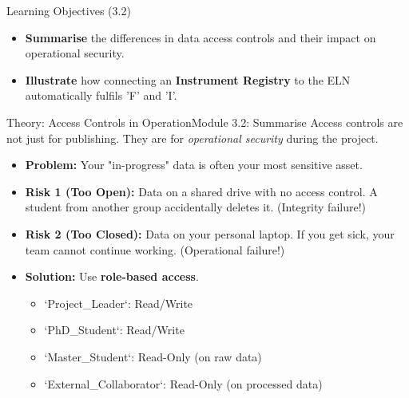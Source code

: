\begin{frame}{Learning Objectives (3.2)}
    \begin{itemize}
        \item \textbf{Summarise} the differences in data access controls and their impact on operational security.
        \item \textbf{Illustrate} how connecting an \textbf{Instrument Registry} to the ELN automatically fulfils 'F' and 'I'.
    \end{itemize}
\end{frame}

\begin{frame}{Theory: Access Controls in Operation}{Module 3.2: Summarise}
    Access controls are not just for publishing. They are for \emph{operational security} during the project.
    
    \begin{itemize}
        \item \textbf{Problem:} Your "in-progress" data is often your most sensitive asset.
        \pause
        \item \textbf{Risk 1 (Too Open):} Data on a shared drive with no access control. A student from another group accidentally deletes it. (Integrity failure!)
        \pause
        \item \textbf{Risk 2 (Too Closed):} Data on your personal laptop. If you get sick, your team cannot continue working. (Operational failure!)
        \pause
        \item \textbf{Solution:} Use \textbf{role-based access}.
        \begin{itemize}
            \item `Project\_Leader`: Read/Write
            \item `PhD\_Student`: Read/Write
            \item `Master\_Student`: Read-Only (on raw data)
            \item `External\_Collaborator`: Read-Only (on processed data)
        \end{itemize}
    \end{itemize}
\end{frame}

